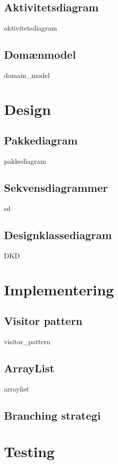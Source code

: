 \documentclass{article}
\begin{document}
{\subsection{Aktivitetsdiagram}
{aktivitetsdiagram}
\newpage
\subsection{Domænmodel}
{domain_model}
\newpage

\section{Design}

\subsection{Pakkediagram}
{pakkediagram}
\newpage
\subsection{Sekvensdiagrammer}
{sd}
\newpage
\subsection{Designklassediagram}
{DKD}
\newpage
\section{Implementering}
\subsection{Visitor pattern}
{visitor_pattern}
\subsection{ArrayList}
{arraylist}
\subsection{Branching strategi}
\newpage
\section{Testing}
}
\end{document}
